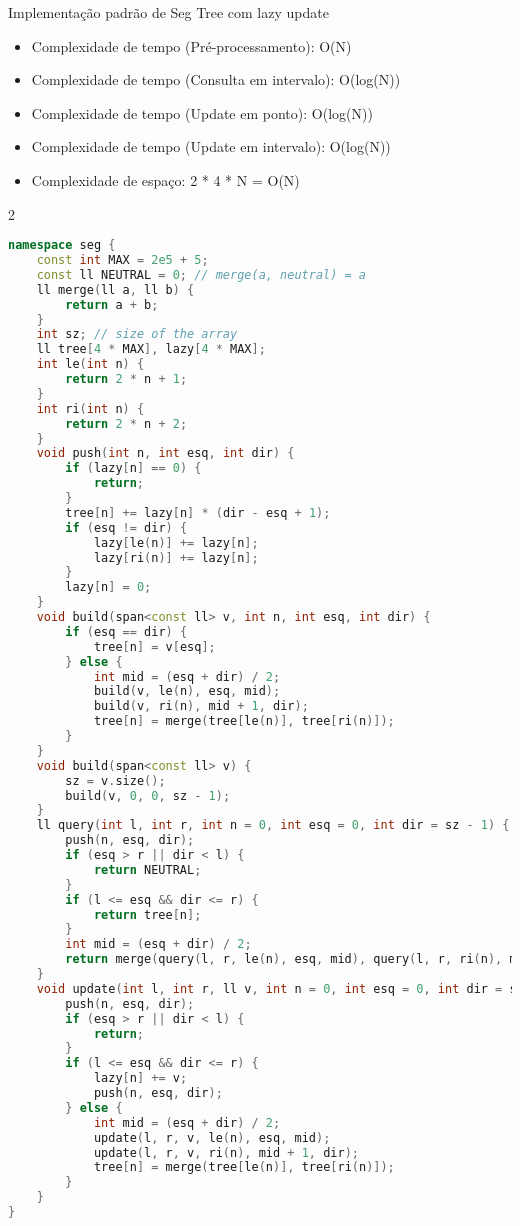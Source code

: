 \documentclass[11pt, a4paper, oneside]{book}
\begin{document}
Implementação padrão de Seg Tree com lazy update



\begin{itemize}
\item Complexidade de tempo (Pré-processamento): O(N)
\item Complexidade de tempo (Consulta em intervalo): O(log(N))
\item Complexidade de tempo (Update em ponto): O(log(N))
\item Complexidade de tempo (Update em intervalo): O(log(N))
\item Complexidade de espaço: 2 * 4 * N = O(N)
\end{itemize}

\hfill

\begin{multicols}{2}
\begin{lstlisting}[language=C++]
namespace seg {
    const int MAX = 2e5 + 5;
    const ll NEUTRAL = 0; // merge(a, neutral) = a
    ll merge(ll a, ll b) {
        return a + b;
    }
    int sz; // size of the array
    ll tree[4 * MAX], lazy[4 * MAX];
    int le(int n) {
        return 2 * n + 1;
    }
    int ri(int n) {
        return 2 * n + 2;
    }
    void push(int n, int esq, int dir) {
        if (lazy[n] == 0) {
            return;
        }
        tree[n] += lazy[n] * (dir - esq + 1);
        if (esq != dir) {
            lazy[le(n)] += lazy[n];
            lazy[ri(n)] += lazy[n];
        }
        lazy[n] = 0;
    }
    void build(span<const ll> v, int n, int esq, int dir) {
        if (esq == dir) {
            tree[n] = v[esq];
        } else {
            int mid = (esq + dir) / 2;
            build(v, le(n), esq, mid);
            build(v, ri(n), mid + 1, dir);
            tree[n] = merge(tree[le(n)], tree[ri(n)]);
        }
    }
    void build(span<const ll> v) {
        sz = v.size();
        build(v, 0, 0, sz - 1);
    }
    ll query(int l, int r, int n = 0, int esq = 0, int dir = sz - 1) {
        push(n, esq, dir);
        if (esq > r || dir < l) {
            return NEUTRAL;
        }
        if (l <= esq && dir <= r) {
            return tree[n];
        }
        int mid = (esq + dir) / 2;
        return merge(query(l, r, le(n), esq, mid), query(l, r, ri(n), mid + 1, dir));
    }
    void update(int l, int r, ll v, int n = 0, int esq = 0, int dir = sz - 1) {
        push(n, esq, dir);
        if (esq > r || dir < l) {
            return;
        }
        if (l <= esq && dir <= r) {
            lazy[n] += v;
            push(n, esq, dir);
        } else {
            int mid = (esq + dir) / 2;
            update(l, r, v, le(n), esq, mid);
            update(l, r, v, ri(n), mid + 1, dir);
            tree[n] = merge(tree[le(n)], tree[ri(n)]);
        }
    }
}
\end{lstlisting}
\end{multicols}
\end{document}
